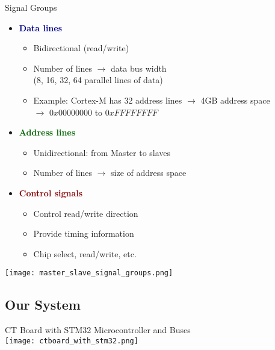 \begin{theorem}{Signal Groups}
    \begin{itemize}
        \item \textcolor{darkblue}{\textbf{Data lines}}
        \begin{itemize}
            \item Bidirectional (read/write)
            \item Number of lines $\rightarrow$ data bus width \\(8, 16, 32, 64 parallel lines of data)
            \item Example: Cortex-M has 32 address lines $\rightarrow$ 4GB address space \\ $\rightarrow$ $0x00000000$ to $0xFFFFFFFF$
        \end{itemize}
        \item \textcolor{darkgreen}{\textbf{Address lines}}
        \begin{itemize}
            \item Unidirectional: from Master to slaves
            \item Number of lines $\rightarrow$ size of address space
        \end{itemize}
        \item \textcolor{darkred}{\textbf{Control signals}}
        \begin{itemize}
            \item Control read/write direction
            \item Provide timing information
            \item Chip select, read/write, etc.
        \end{itemize}
    \end{itemize}
    \vspace{2mm}
    \texttt{[image: master\_slave\_signal\_groups.png]}
\end{theorem}

\multend

\subsection{Our System}

\begin{example2}{CT Board with STM32 Microcontroller and Buses}\\
    \texttt{[image: ctboard\_with\_stm32.png]}
\end{example2}

